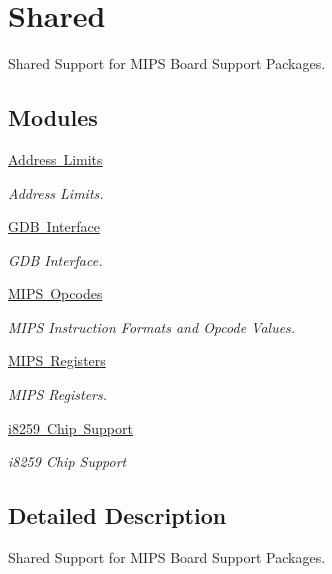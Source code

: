 \hypertarget{group__RTEMSBSPsMIPSShared}{}\section{Shared}
\label{group__RTEMSBSPsMIPSShared}


Shared Support for M\+I\+PS Board Support Packages.  


\subsection*{Modules}
\begin{DoxyCompactItemize}
\item 
\mbox{\hyperlink{group__mips__limits}{Address Limits}}
\begin{DoxyCompactList}\small\item\em Address Limits. \end{DoxyCompactList}\item 
\mbox{\hyperlink{group__mips__gdb}{G\+D\+B Interface}}
\begin{DoxyCompactList}\small\item\em G\+DB Interface. \end{DoxyCompactList}\item 
\mbox{\hyperlink{group__mips__ops}{M\+I\+P\+S Opcodes}}
\begin{DoxyCompactList}\small\item\em M\+I\+PS Instruction Formats and Opcode Values. \end{DoxyCompactList}\item 
\mbox{\hyperlink{group__mips__regs}{M\+I\+P\+S Registers}}
\begin{DoxyCompactList}\small\item\em M\+I\+PS Registers. \end{DoxyCompactList}\item 
\mbox{\hyperlink{group__mips__i8259__irq}{i8259 Chip Support}}
\begin{DoxyCompactList}\small\item\em i8259 Chip Support \end{DoxyCompactList}\end{DoxyCompactItemize}


\subsection{Detailed Description}
Shared Support for M\+I\+PS Board Support Packages. 

